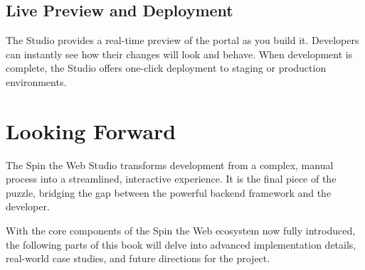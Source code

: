 \subsection{Live Preview and Deployment}
The Studio provides a real-time preview of the portal as you build it. Developers can instantly see how their changes will look and behave. When development is complete, the Studio offers one-click deployment to staging or production environments.

\section{Looking Forward}
\label{sec:studio-forward}

The Spin the Web Studio transforms \webbase{} development from a complex, manual process into a streamlined, interactive experience. It is the final piece of the puzzle, bridging the gap between the powerful backend framework and the developer.

With the core components of the Spin the Web ecosystem now fully introduced, the following parts of this book will delve into advanced implementation details, real-world case studies, and future directions for the project.
